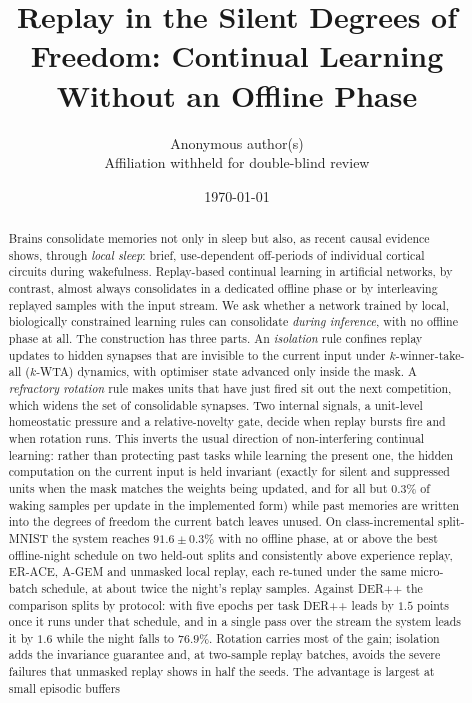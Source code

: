 \documentclass{article}
\title{Replay in the Silent Degrees of Freedom: Continual Learning Without an Offline Phase}
\author{%
  Anonymous author(s)\\
  Affiliation withheld for double-blind review}
\date{\today}
\newcommand{\kwta}{$k$-WTA}
\begin{document}
\maketitle

\begin{abstract}
Brains consolidate memories not only in sleep but also, as recent causal evidence shows,
through \emph{local sleep}: brief, use-dependent off-periods of individual cortical circuits
during wakefulness. Replay-based continual learning in artificial networks, by contrast,
almost always consolidates in a dedicated offline phase or by interleaving replayed samples
with the input stream. We ask whether a network trained by local, biologically constrained
learning rules can consolidate \emph{during inference}, with no offline phase at all. The
construction has three parts. An \emph{isolation} rule confines replay updates to hidden
synapses that are invisible to the current input under $k$-winner-take-all (\kwta) dynamics,
with optimiser state advanced only inside the mask. A \emph{refractory rotation} rule makes
units that have just fired sit out the next competition, which widens the set of consolidable
synapses. Two internal signals, a unit-level homeostatic pressure and a relative-novelty gate,
decide when replay bursts fire and when rotation runs. This inverts the usual direction of
non-interfering continual learning: rather than protecting past tasks while learning the
present one, the hidden computation on the current input is held invariant (exactly for silent and suppressed units when the mask matches the weights being updated, and for
all but $0.3\%$ of waking samples per update in the implemented form)
while past memories are written into the degrees of freedom the current batch leaves unused.
On class-incremental split-MNIST the system reaches $91.6\pm0.3\%$ with no offline phase, at
or above the best offline-night schedule on two held-out splits and consistently above
experience replay, ER-ACE, A-GEM and unmasked local replay, each re-tuned under the same
micro-batch schedule, at about twice the night's replay samples. Against DER++ the
comparison splits by protocol: with five epochs per task DER++ leads by $1.5$ points once it
runs under that schedule, and in a single pass over the stream the system leads it by $1.6$
while the night falls to $76.9\%$. Rotation carries most of the gain; isolation adds
the invariance guarantee and, at two-sample replay batches, avoids the severe failures that
unmasked replay shows in half the seeds. The advantage is largest at small episodic buffers

\end{abstract}
\end{document}
